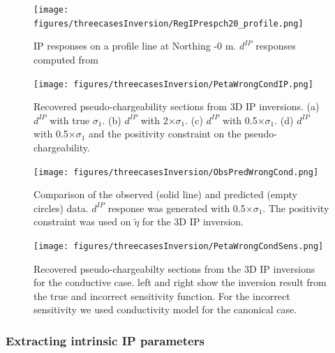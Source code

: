 \documentclass[a4paper, 11pt]{article}
\newcommand{\siginf}{\sigma_\infty}
\newcommand{\peta}{\tilde{\eta}}
\newcommand{\dip}{d^{IP}}
\begin{document}
\begin{figure}[htb]
  \centering \texttt{[image: figures/threecasesInversion/RegIPrespch20\_profile.png]}
  \caption{IP responses on a profile line at Northing -0 m. $\dip$ responses computed from }
  \label{F:ObsRegIPrespch20_profilePredDepth}
\end{figure}

\begin{figure}[htb]
  \centering \texttt{[image: figures/threecasesInversion/PetaWrongCondIP.png]}
  \caption{Recovered pseudo-chargeability sections from 3D IP inversions. (a) $\dip$ with true $\sigma_1$. (b) $\dip$ with 2$\times \sigma_1$. (c) $\dip$ with 0.5$\times \sigma_1$. (d) $\dip$ with 0.5$\times \sigma_1$ and the positivity constraint on the pseudo-chargeability.}
  \label{F:PetaWrongCondIP}
\end{figure}

\begin{figure}[htb]
  \centering \texttt{[image: figures/threecasesInversion/ObsPredWrongCond.png]}
  \caption{Comparison of the observed (solid line) and predicted (empty circles) data. $\dip$ response was generated with 0.5$\times \sigma_1$. The positivity constraint was used on $\peta$ for the 3D IP inversion.}
  \label{F:ObsPredWrongCond}
\end{figure}

\begin{figure}[htb]
  \centering \texttt{[image: figures/threecasesInversion/PetaWrongCondSens.png]}
  \caption{Recovered pseudo-chargeabilty sections from the 3D IP inversions for the conductive case. left and right show the inversion result from the true and incorrect sensitivity function. For the incorrect sensitivity we used conductivity model for the canonical case. }
  \label{F:PetaWrongCondSens}
\end{figure}
\clearpage


\subsubsection{Extracting intrinsic IP parameters}
\end{document}
